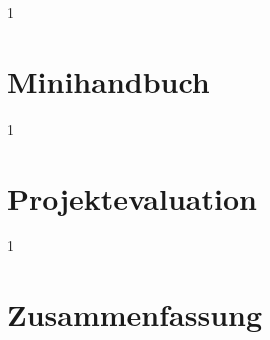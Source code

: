 \documentclass[12pt,a4paper,titlepage,listof=totoc,bibliography=totoc,chapteratlists=0pt]{scrreprt}
\begin{document}
\begin{spacing}{1}
\chapter{Minihandbuch}\label{chapter:minihandbuch}
\end{spacing}


\begin{spacing}{1}
\chapter{Projektevaluation}\label{chapter:projektevaluation}
\end{spacing}


\begin{spacing}{1}
\chapter{Zusammenfassung}
\end{spacing}


\newpage
{}
\setcounter{page}{\value{RPages}}

\glsnogroupskiptrue
{}
{
	\printglossary[title=Glossar,toctitle=Glossar] %
}
{
	\printglossary[title=Glossary,toctitle=Glossary] %
}
\listoffigures
\listoftables
\lstlistoflistings
\appendix
{}

\end{document}
